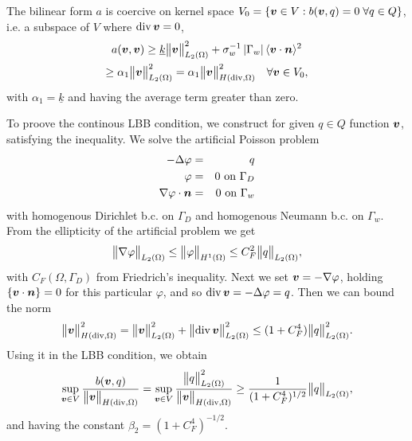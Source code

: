 The bilinear form $a$ is coercive on kernel space $V_0=\{\mathbf{\boldsymbol{v}}\in V: b(\mathbf{\boldsymbol{v}},q)=0\;\forall q\in Q\}$, i.e.
a subspace of $V$ where ${\rm div}\,\mathbf{\boldsymbol{v}}=0$,
\begin{multline}
    a(\mathbf{\boldsymbol{v}},\mathbf{\boldsymbol{v}}) \geq \underline{k} \bigl\Vert\mathbf{\boldsymbol{v}}\bigr\Vert^2_{L_2(\Omega)}
                + \sigma_w^{-1}\left|\Gamma_w\right|\langle\mathbf{\boldsymbol{v}}\cdot\mathbf{\boldsymbol{n}}\rangle^2 \\
        \geq  \alpha_1 \bigl\Vert\mathbf{\boldsymbol{v}}\bigr\Vert^2_{L_2(\Omega)} = \alpha_1 \bigl\Vert\mathbf{\boldsymbol{v}}\bigr\Vert^2_{H({\rm div},\Omega)} \quad \forall \mathbf{\boldsymbol{v}}\in V_0,
\end{multline}
with $\alpha_1=\underline{k}$ and having the average term greater than zero.

To proove the continous LBB condition, we construct for given $q\in Q$ function $\mathbf{\boldsymbol{v}}$, satisfying the inequality.
We solve the artificial Poisson problem
\begin{eqnarray*}    
    -\Delta\varphi &=& q\\
    \varphi &=& 0 \textrm{ on } \Gamma_D \\
    \nabla\varphi\cdot\mathbf{\boldsymbol{n}} &=& 0 \textrm{ on } \Gamma_w \\
\end{eqnarray*}
with homogenous Dirichlet b.c. on $\Gamma_D$ and homogenous Neumann b.c. on $\Gamma_w$.
From the ellipticity of the artificial problem we get
\begin{equation}
    \bigl\Vert\nabla\varphi\bigr\Vert_{L_2(\Omega)} \leq \bigl\Vert\varphi\bigr\Vert_{H^1(\Omega)}
        \leq C_F^2 \bigl\Vert q\bigr\Vert_{L_2(\Omega)},
\end{equation}
with $C_F(\Omega,\Gamma_D)$ from Friedrich's inequality.
Next we set $\mathbf{\boldsymbol{v}} = -\nabla \varphi$, holding $\{\mathbf{\boldsymbol{v}}\cdot\mathbf{\boldsymbol{n}}\}=0$ for this particular $\varphi$,
and so ${\rm div}\,\mathbf{\boldsymbol{v}} = -\Delta\varphi=q$. Then we can bound the norm
\begin{equation}
    \bigl\Vert\mathbf{\boldsymbol{v}}\bigr\Vert^2_{H({\rm div},\Omega)} = \bigl\Vert\mathbf{\boldsymbol{v}}\bigr\Vert^2_{L_2(\Omega)} 
        + \bigl\Vert{\rm div}\,\mathbf{\boldsymbol{v}}\bigr\Vert^2_{L_2(\Omega)}
        \leq (1+C_F^4) \bigl\Vert q\bigr\Vert^2_{L_2(\Omega)}.
\end{equation}
Using it in the LBB condition, we obtain
\begin{equation}
    \sup_{\mathbf{\boldsymbol{v}}\in V} \frac{b(\mathbf{\boldsymbol{v}},q)}{\bigl\Vert\mathbf{\boldsymbol{v}}\bigr\Vert_{H({\rm div},\Omega)}} =
    \sup_{\mathbf{\boldsymbol{v}}\in V} \frac{\bigl\Vert q\bigr\Vert^2_{L_2(\Omega)}}{\bigl\Vert\mathbf{\boldsymbol{v}}\bigr\Vert_{H({\rm div},\Omega)}}
    \geq \frac{1}{(1+C_F^4)^{1/2}} \bigl\Vert q\bigr\Vert_{L_2(\Omega)},
\end{equation}
and having the constant $\beta_2 = (1+C_F^4)^{-1/2}$.

% 



